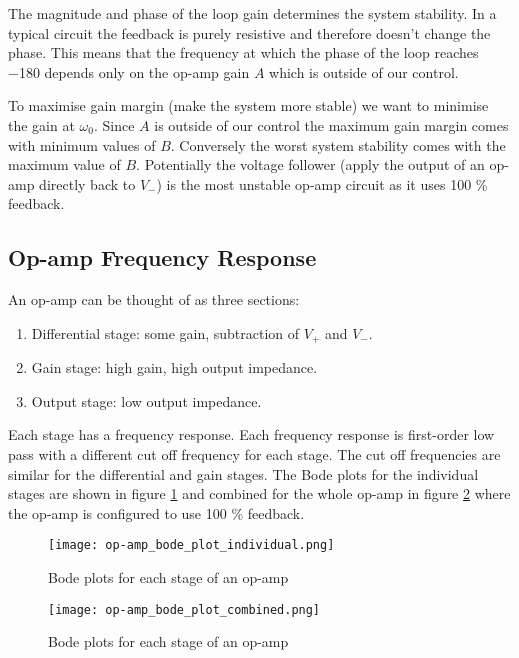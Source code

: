 \documentclass{article}
\begin{document}
    The magnitude and phase of the loop gain determines the system stability.
    In a typical circuit the feedback is purely resistive and therefore doesn't change the phase.
    This means that the frequency at which the phase of the loop reaches \SI{-180}{\SIUnitSymbolDegree} depends only on the op-amp gain \(A\) which is outside of our control.
    
    To maximise gain margin (make the system more stable) we want to minimise the gain at \(\omega_0\).
    Since \(A\) is outside of our control the maximum gain margin comes with minimum values of \(B\).
    Conversely the worst system stability comes with the maximum value of \(B\).
    Potentially the voltage follower (apply the output of an op-amp directly back to \(V_-\)) is the most unstable op-amp circuit as it uses 100 \% feedback.
    
    \subsection{Op-amp Frequency Response}
    An op-amp can be thought of as three sections:
    \begin{enumerate}
        \item Differential stage: some gain, subtraction of \(V_+\) and \(V_-\).
        \item Gain stage: high gain, high output impedance.
        \item Output stage: low output impedance.
    \end{enumerate}
    Each stage has a frequency response.
    Each frequency response is first-order low pass with a different cut off frequency for each stage.
    The cut off frequencies are similar for the differential and gain stages.
    The Bode plots for the individual stages are shown in figure \ref{fig:op-amp bode plot individual} and combined for the whole op-amp in figure \ref{fig:op-amp bode plot combined} where the op-amp is configured to use 100 \% feedback.
    
    \begin{figure}[ht]
        \centering
        \texttt{[image: op-amp\_bode\_plot\_individual.png]}
        \caption{Bode plots for each stage of an op-amp}
        \label{fig:op-amp bode plot individual}
    \end{figure}

    \begin{figure}[ht]
        \centering
        \texttt{[image: op-amp\_bode\_plot\_combined.png]}
        \caption{Bode plots for each stage of an op-amp}
        \label{fig:op-amp bode plot combined}
    \end{figure}
    
\end{document}
